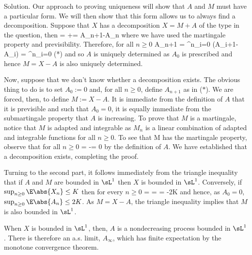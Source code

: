 \scutline

Solution. Our approach to proving uniqueness will show that $A$ and $M$ must have a particular form. We will then show that this form allows us to always find a decomposition. Suppose that $X$ has a decomposition $X = M+A$ of the type in the question, then
\be
\E[X_{n+1}-X_n|\sF_n] = \E[M_{n+1}-M_n|\sF_n] +\E[A_{n+1}-A_n|\sF_n] = A_{n+1}-A_n
\ee
where we have used the martingale property and previsibility. Therefore, for all $n \geq 0$
\be
A_{n+1} = \sum^n_{i=0} (A_{i+1}-A_i) = \sum^n_{i=0} \E[X_{i+1}-X_i|\sF_i]\qquad (*)
\ee
and so $A$ is uniquely determined as $A_0$ is prescribed and hence $M = X -A$ is also uniquely determined.

Now, suppose that we don't know whether a decomposition exists. The obvious thing to do is to set $A_0 := 0$ and, for all $n \geq 0$, define $A_{n+1}$ as in ($*$). We are forced, then, to define $M := X -A$. It is immediate from the definition of $A$ that it is previsible and such that $A_0 = 0$, it is equally immediate from the submartingale property that $A$ is increasing. To prove that $M$ is a martingale, notice that $M$ is adapted and integrable as $M_n$ is a linear combination of adapted and integrable functions for all $n \geq 0$. To see that M has the martingale property, observe that for all $n \geq 0$
\be
\E[M_{n+1}-M_n|\sF_n] = \E[X_{n+1}-X_n|\sF_n]-\E[A_{n+1}-A_n|\sF_n] = 0
\ee
by the definition of $A$. We have established that a decomposition exists, completing the proof.

Turning to the second part, it follows immediately from the triangle inequality that if $A$ and $M$ are bounded in $\sL^1$ then $X$ is bounded in $\sL^1$. Conversely, if $\sup_{n\geq 0}\E\abs{X_n} \leq K$ then for every $n \geq 0$
\be
\E{} = \E[A_{n+1}] = \E\bb{\sum^n_{i=0} \E[X_{i+1}-X_i|\sF_i} = \E[X_n]-\E[X_0] \leq 2K
\ee
and hence, as $A_0 = 0$, $\sup_{n\geq 0}\E\abs{A_n} \leq 2K$. As $M = X -A$, the triangle inequality implies that $M$ is also bounded in $\sL^1$.

When $X$ is bounded in $\sL^1$, then, $A$ is a nondecreasing process bounded in $\sL^1$. There is therefore an a.s. limit, $A_\infty$, which has finite expectation by the monotone convergence theorem.

\vspace{2mm}

\qcutline


